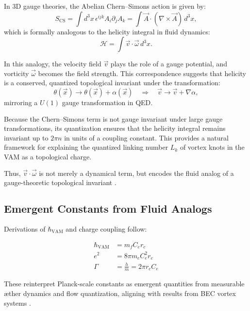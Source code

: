 In 3D gauge theories, the Abelian Chern--Simons action is given by:
\begin{equation}
S_{\text{CS}} = \int d^3x\, \epsilon^{ijk} A_i \partial_j A_k = \int \vec{A} \cdot (\nabla \times \vec{A})\, d^3x,
\end{equation}
which is formally analogous to the helicity integral in fluid dynamics:
\begin{equation}
\mathcal{H} = \int \vec{v} \cdot \vec{\omega}\, d^3x.
\end{equation}

In this analogy, the velocity field $\vec{v}$ plays the role of a gauge potential, and vorticity $\vec{\omega}$ becomes the field strength. This correspondence suggests that helicity is a conserved, quantized topological invariant under the transformation:
\begin{equation}
\theta(\vec{x}) \rightarrow \theta(\vec{x}) + \alpha(\vec{x}) \quad \Rightarrow \quad \vec{v} \rightarrow \vec{v} + \nabla \alpha,
\end{equation}
mirroring a $U(1)$ gauge transformation in QED.

Because the Chern--Simons term is not gauge invariant under large gauge transformations, its quantization ensures that the helicity integral remains invariant up to $2\pi n$ in units of a coupling constant. This provides a natural framework for explaining the quantized linking number $L_k$ of vortex knots in the VAM as a topological charge.

Thus, $\vec{v} \cdot \vec{\omega}$ is not merely a dynamical term, but encodes the fluid analog of a gauge-theoretic topological invariant \cite{moffatt1969degree,jackiw1990chern,verlinde2021qft}.


\subsection{Emergent Constants from Fluid Analogs}
Derivations of $\hbar_{\text{VAM}}$ and charge coupling follow:

\begin{align}
    \hbar_{\text{VAM}} &= m_f C_e r_c \\
    e^2 &= 8\pi m_e C_e^2 r_c \\
    \Gamma &= \frac{h}{m} = 2\pi r_c C_e
\end{align}

These reinterpret Planck-scale constants as emergent quantities from measurable æther dynamics and flow quantization, aligning with results from BEC vortex systems \cite{Pethick2008BEC,Donnelly1991QuantizedVortices}.

